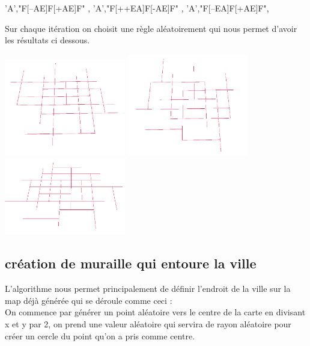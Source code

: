 \begin{center}
  'A',"F[--AE]F[+AE]F" , 'A',"F[++EA]F[-AE]F" , 'A',"F[--EA]F[+AE]F",
\end{center} 

Sur chaque itération on choisit une règle aléatoirement qui nous permet d’avoir les résultats ci dessous.

\begin{center}
  \includegraphics[width = 200px]{images/lsystem1.png}
  \includegraphics[width = 200px]{images/lsystem2.png}
  \includegraphics[width = 200px]{images/lsystem3.png}
\end{center}

\newpage

\subsection{création de muraille qui entoure la ville}

L’algorithme nous permet principalement de définir l’endroit de la ville sur la map déjà générée qui se déroule comme ceci :\\

On commence par générer un point aléatoire vers le centre de la carte en divisant x et y par 2, on prend une valeur aléatoire qui servira de rayon aléatoire pour créer un cercle du point qu'on a pris comme centre. \\

